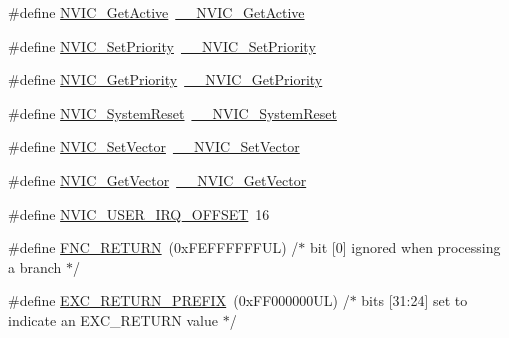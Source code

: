 \begin{DoxyCompactItemize}
\item 
\#define \hyperlink{group___c_m_s_i_s___core___n_v_i_c_functions_ga58ad3f352f832235ab3b192ff4745320}{N\+V\+I\+C\+\_\+\+Get\+Active}~\hyperlink{group___c_m_s_i_s___core___n_v_i_c_functions_gaa2837003c28c45abf193fe5e8d27f593}{\+\_\+\+\_\+\+N\+V\+I\+C\+\_\+\+Get\+Active}
\item 
\#define \hyperlink{group___c_m_s_i_s___core___n_v_i_c_functions_gae0e9d0e2f7b6133828c71b57d4941c35}{N\+V\+I\+C\+\_\+\+Set\+Priority}~\hyperlink{group___c_m_s_i_s___core___n_v_i_c_functions_ga505338e23563a9c074910fb14e7d45fd}{\+\_\+\+\_\+\+N\+V\+I\+C\+\_\+\+Set\+Priority}
\item 
\#define \hyperlink{group___c_m_s_i_s___core___n_v_i_c_functions_gaf59b9d0a791d2157abb319753953eceb}{N\+V\+I\+C\+\_\+\+Get\+Priority}~\hyperlink{group___c_m_s_i_s___core___n_v_i_c_functions_gaeb9dc99c8e7700668813144261b0bc73}{\+\_\+\+\_\+\+N\+V\+I\+C\+\_\+\+Get\+Priority}
\item 
\#define \hyperlink{group___c_m_s_i_s___core___n_v_i_c_functions_ga6aa0367d3642575610476bf0366f0c48}{N\+V\+I\+C\+\_\+\+System\+Reset}~\hyperlink{group___c_m_s_i_s___core___n_v_i_c_functions_ga0d9aa2d30fa54b41eb780c16e35b676c}{\+\_\+\+\_\+\+N\+V\+I\+C\+\_\+\+System\+Reset}
\item 
\#define \hyperlink{group___c_m_s_i_s___core___n_v_i_c_functions_ga804af63bb4c4c317387897431814775d}{N\+V\+I\+C\+\_\+\+Set\+Vector}~\hyperlink{group___c_m_s_i_s___core___n_v_i_c_functions_ga0df355460bc1783d58f9d72ee4884208}{\+\_\+\+\_\+\+N\+V\+I\+C\+\_\+\+Set\+Vector}
\item 
\#define \hyperlink{group___c_m_s_i_s___core___n_v_i_c_functions_ga955eb1c33a3dcc62af11a8385e8c0fc8}{N\+V\+I\+C\+\_\+\+Get\+Vector}~\hyperlink{group___c_m_s_i_s___core___n_v_i_c_functions_ga44b665d2afb708121d9b10c76ff00ee5}{\+\_\+\+\_\+\+N\+V\+I\+C\+\_\+\+Get\+Vector}
\item 
\#define \hyperlink{group___c_m_s_i_s___core___n_v_i_c_functions_ga8045d905a5ca57437d8e6f71ffcb6df5}{N\+V\+I\+C\+\_\+\+U\+S\+E\+R\+\_\+\+I\+R\+Q\+\_\+\+O\+F\+F\+S\+ET}~16
\item 
\#define \hyperlink{group___c_m_s_i_s___core___n_v_i_c_functions_gabaa62910bf89acc186ae998c611e64ab}{F\+N\+C\+\_\+\+R\+E\+T\+U\+RN}~(0x\+F\+E\+F\+F\+F\+F\+F\+F\+U\+L)     /$\ast$ bit \mbox{[}0\mbox{]} ignored when processing a branch                             $\ast$/
\item 
\#define \hyperlink{group___c_m_s_i_s___core___n_v_i_c_functions_ga99e0c1c19f050880a8bd827a7f420bec}{E\+X\+C\+\_\+\+R\+E\+T\+U\+R\+N\+\_\+\+P\+R\+E\+F\+IX}~(0x\+F\+F000000\+U\+L)     /$\ast$ bits \mbox{[}31\+:24\mbox{]} set to indicate an E\+X\+C\+\_\+\+R\+E\+T\+U\+R\+N value                     $\ast$/

\end{DoxyCompactItemize}
